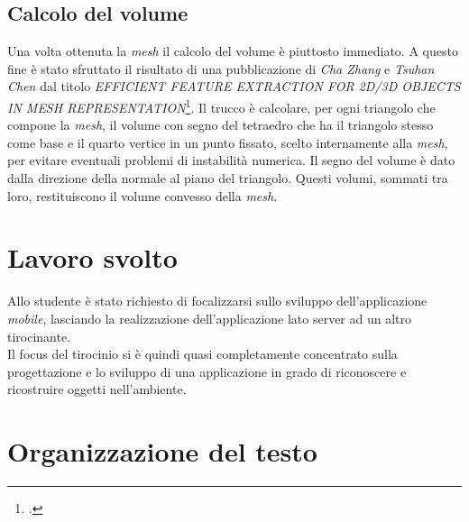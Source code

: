 \subsection{Calcolo del volume}
Una volta ottenuta la \emph{mesh} il calcolo del volume è piuttosto immediato. A questo fine è stato sfruttato il risultato di una pubblicazione di \emph{Cha Zhang} e \emph{Tsuhan Chen} dal titolo \emph{EFFICIENT FEATURE EXTRACTION FOR 2D/3D OBJECTS
IN MESH REPRESENTATION}\footcite{site: http://research.microsoft.com/en-us/um/people/chazhang/publications/icip01_ChaZhang.pdf}.
Il trucco è calcolare, per ogni triangolo che compone la \emph{mesh}, il volume con segno del tetraedro che ha il triangolo stesso come base e il quarto vertice in un punto fissato, scelto internamente alla \emph{mesh}, per evitare eventuali problemi di instabilità numerica. Il segno del volume è dato dalla direzione della normale al piano del triangolo. Questi volumi, sommati tra loro, restituiscono il volume convesso della \emph{mesh}.


\section{Lavoro svolto}
Allo studente è stato richiesto di focalizzarsi sullo sviluppo dell'applicazione \emph{mobile}, lasciando la realizzazione dell'applicazione lato server ad un altro tirocinante.\\
Il focus del tirocinio si è quindi quasi completamente concentrato sulla progettazione e lo sviluppo di una applicazione in grado di riconoscere e ricostruire oggetti nell'ambiente.


\section{Organizzazione del testo}

%
%    
%    
%    
%    
%    

